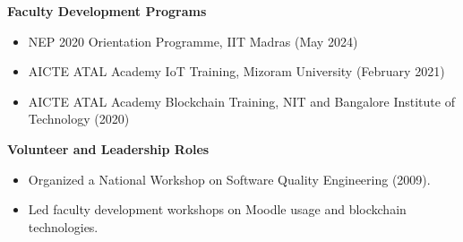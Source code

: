 \documentclass[a4paper,10pt]{article}
\newcommand{\cvsection}[1]{%
    \vspace{2mm}
    \begin{tcolorbox}
        \textbf{\large #1}
    \end{tcolorbox}
    \vspace{-4mm}
}
\begin{document}
\cvsection{Faculty Development Programs}
\begin{itemize}[leftmargin=*]
    \item NEP 2020 Orientation Programme, IIT Madras (May 2024)
    \item AICTE ATAL Academy IoT Training, Mizoram University (February 2021)
    \item AICTE ATAL Academy Blockchain Training, NIT and Bangalore Institute of Technology (2020)
\end{itemize}

\cvsection{Volunteer and Leadership Roles}
\begin{itemize}[leftmargin=*]
    \item Organized a National Workshop on Software Quality Engineering (2009).
    \item Led faculty development workshops on Moodle usage and blockchain technologies.
\end{itemize}
\end{document}
